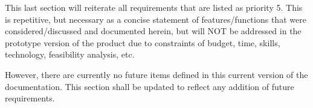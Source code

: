 This last section will reiterate all requirements that are listed as priority 5. This is repetitive, but necessary as a concise statement of features/functions that were considered/discussed and documented herein, but will NOT be addressed in the prototype version of the product due to constraints of budget, time, skills, technology, feasibility analysis, etc. 

However, there are currently no future items defined in this current version of the documentation. This section shall be updated to reflect any addition of future requirements.